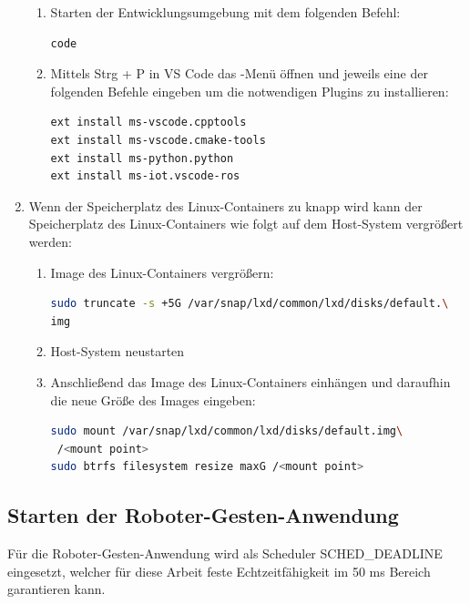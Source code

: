\begin{enumerate}[label*=\arabic*.]
\begin{enumerate}[label*=\arabic*.]
            \item Starten der Entwicklungsumgebung mit dem folgenden Befehl:
                \begin{lstlisting}[language=bash]
code
                \end{lstlisting}

            \item Mittels Strg + P in VS Code das -Menü öffnen und jeweils eine der folgenden Befehle eingeben um die notwendigen Plugins zu installieren:
                \begin{lstlisting}[language=bash]
ext install ms-vscode.cpptools
ext install ms-vscode.cmake-tools
ext install ms-python.python
ext install ms-iot.vscode-ros
                \end{lstlisting}
        \end{enumerate}

        \item Wenn der Speicherplatz des Linux-Containers zu knapp wird kann der Speicherplatz des Linux-Containers wie folgt auf dem Host-System vergrößert werden:
            \begin{enumerate}[label*=\arabic*.]
                \item Image des Linux-Containers vergrößern:
                    \begin{lstlisting}[language=bash]
sudo truncate -s +5G /var/snap/lxd/common/lxd/disks/default.\
img
                    \end{lstlisting}

                \item Host-System neustarten

                \item Anschließend das Image des Linux-Containers einhängen und daraufhin die neue Größe des Images eingeben:
                    \begin{lstlisting}[language=bash]
sudo mount /var/snap/lxd/common/lxd/disks/default.img\
 /<mount point>
sudo btrfs filesystem resize maxG /<mount point>
                    \end{lstlisting}
            \end{enumerate}
\end{enumerate}


\subsection{Starten der Roboter-Gesten-Anwendung}
Für die Roboter-Gesten-Anwendung wird als Scheduler SCHED\_DEADLINE eingesetzt, welcher für diese Arbeit feste Echtzeitfähigkeit im 50 ms Bereich garantieren kann.

